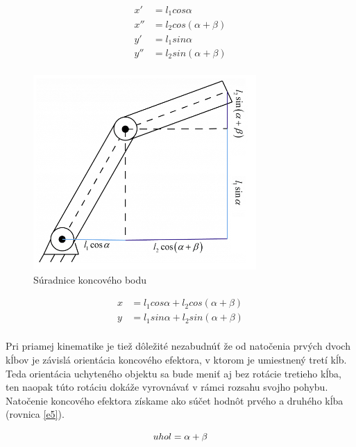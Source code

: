 \begin{equation}
	\begin{aligned}
		x'&= l_1 cos \alpha \\
		x''&= l_2 cos (\alpha + \beta) \\
		y'&= l_1 sin \alpha \\
		y''&= l_2 sin (\alpha + \beta) \\
	\end{aligned}
 \label{e1} 
\end{equation}

\begin{figure}[h]
	\centering
	\includegraphics[width=85mm]{img/FK2.png}
	\caption{Súradnice koncového bodu \cite{FKIK} } \label{OBRAZOK 4.9} 
\end{figure} 

\begin{equation}
	\begin{aligned}
		x&= l_1 cos \alpha + l_2 cos (\alpha + \beta) \\
		y&= l_1 sin \alpha +  l_2 sin (\alpha + \beta) \\
	\end{aligned}
 \label{e2} 
\end{equation}

Pri priamej kinematike je tiež dôležité nezabudnúť že od natočenia prvých dvoch kĺbov je závislá orientácia koncového efektora, v ktorom je umiestnený tretí kĺb. Teda orientácia uchyteného objektu sa bude meniť aj bez rotácie tretieho kĺba, ten naopak túto rotáciu dokáže vyrovnávať v rámci rozsahu svojho pohybu. Natočenie koncového efektora získame ako súčet hodnôt prvého a druhého kĺba (rovnica  \ref{e5}).

\begin{equation}
	uhol=\alpha + \beta \\
	\label{e5} 
\end{equation}


